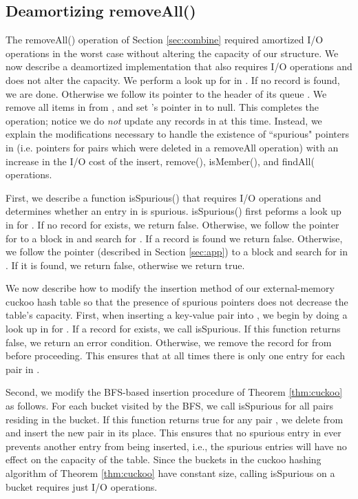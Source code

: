 \documentclass[11pt,letterpaper]{article}
\begin{document}
\subsection{Deamortizing removeAll()}
\label{sec:removeall}
The removeAll() operation of Section \ref{sec:combine} required  amortized I/O operations in the worst case without altering the capacity of our structure.
We now describe a deamortized implementation that also requires  I/O operations and does not alter the capacity. We perform a look up for  in . If no record 
is found, we are done. Otherwise we follow its pointer to the header of its queue . We remove all items in  from , and set 's pointer in  to null. This completes
the operation; notice we do \emph{not}
update any records in  at this time. Instead, we explain the modifications necessary to handle the existence of ``spurious" pointers in  (i.e. pointers for  pairs which were deleted in a removeAll operation) with an  increase in the I/O cost of the insert, remove(), isMember(), and findAll( operations.

First, we describe a function isSpurious() that requires  I/O operations and determines whether an entry  in  is spurious. 
isSpurious() first peforms a look up in  for . If no record for  exists, we return false. Otherwise, we follow the pointer for  to a block  in  and search  for . If a record is found we return false.
Otherwise, we follow the pointer  (described in Section \ref{sec:app}) to a block  and search for  in .  If it is found,
we return false, otherwise we return true. 

We now describe how to modify the insertion method of our external-memory cuckoo hash table  so that the presence of spurious pointers does not decrease 
the table's capacity. First, when inserting a key-value pair  into , we begin by doing a look up in  for . If a record for  exists, we call isSpurious. If this function returns false, we return an error condition. Otherwise, we remove the record for  from  before proceeding.   This ensures that at all times there is only one entry for each pair  in .

Second, we modify the BFS-based insertion procedure of Theorem \ref{thm:cuckoo} as follows. For each bucket visited by the BFS, we 
call isSpurious for all pairs  residing in the bucket. If this function returns true for any pair , we delete  from  and
insert the new pair in its place. This ensures that no spurious entry in  ever prevents another entry from
being inserted, i.e., the spurious entries will have no effect on the capacity of the table. Since the buckets in the cuckoo hashing algorithm of Theorem \ref{thm:cuckoo} have constant size, calling isSpurious on a
bucket requires just  I/O operations.
\end{document}
